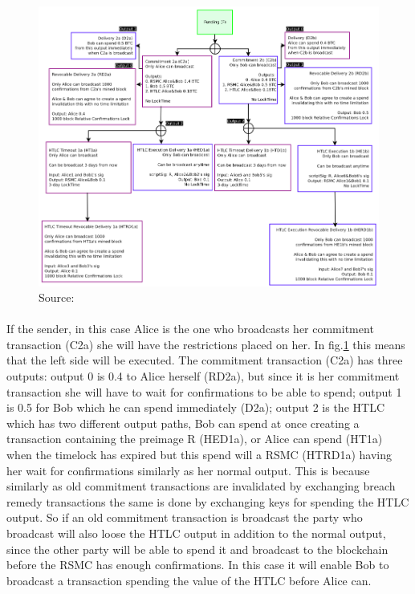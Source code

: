 \documentclass[informationsecurity]{gucmasterproject}
\begin{document}
\begin{figure}[h]
    \centering
    \includegraphics[width=14cm]{ln_htlc.png}
    \caption{  Source: \cite{poon2015bitcoin}}
    \label{fig:htlc_commit}
\end{figure}


\paragraph{}
If the sender, in this case Alice is the one who broadcasts her commitment transaction (C2a) she will have the restrictions placed on her.
In fig.\ref{fig:htlc_commit} this means that the left side will be executed. The commitment transaction (C2a) has three outputs: output 0 is 0.4 to Alice herself (RD2a), but since it is her commitment transaction she will have to wait for confirmations to be able to spend; output 1 is 0.5 for Bob which he can spend immediately (D2a); output 2 is the HTLC which has two different output paths, Bob can spend at once creating a transaction containing the preimage R (HED1a), or Alice can spend (HT1a) when the timelock has expired but this spend will a RSMC (HTRD1a) having her wait for confirmations similarly as her normal output. This is because similarly as old commitment transactions are invalidated by exchanging breach remedy transactions the same is done by exchanging keys for spending the HTLC output. So if an old commitment transaction is broadcast the party who broadcast will also loose the HTLC output in addition to the normal output, since the other party will be able to spend it and broadcast to the blockchain before the RSMC has enough confirmations. In this case it will enable Bob to broadcast a transaction spending the value of the HTLC before Alice can.
\end{document}
